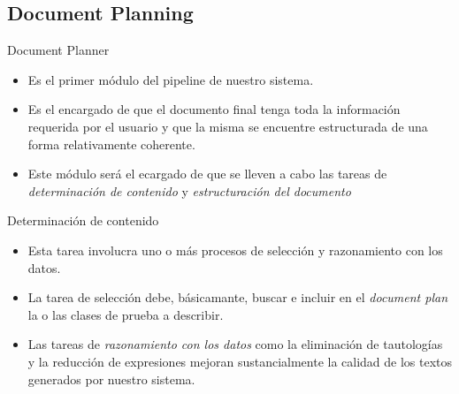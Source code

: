 \documentclass{beamer}
\begin{document}
      \subsection{Document Planning}
                  										
      \begin{frame}{Document Planner}{}
        \begin{itemize}
          \item Es el primer módulo del pipeline de nuestro sistema.
          \item Es el encargado de que el documento final tenga toda la información requerida por el usuario y que la misma se encuentre estructurada de una forma relativamente coherente.
          \item Este módulo será el ecargado de que se lleven a cabo las tareas de \textit{determinación de contenido} y \textit{estructuración del documento}
        \end{itemize}
      \end{frame}
                  										
                  										
      \begin{frame}{Determinación de contenido}{}
        \begin{itemize}
          \item Esta tarea involucra uno o más procesos de selección y razonamiento con los datos.
          \item La tarea de selección debe, básicamante, buscar e incluir en el \textit{document plan} la o las clases de prueba a describir.
          \item Las tareas de \textit{razonamiento con los datos} como la eliminación de tautologías y la reducción de expresiones mejoran sustancialmente la calidad de los textos generados por nuestro sistema.
        \end{itemize}
      \end{frame}
                  										
\end{document}
